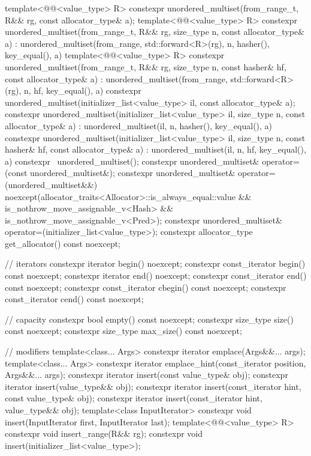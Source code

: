 \begin{codeblock}
{{    template<@@<value_type> R>
      constexpr unordered_multiset(from_range_t, R&& rg, const allocator_type& a);
    template<@@<value_type> R>
      constexpr unordered_multiset(from_range_t, R&& rg, size_type n, const allocator_type& a)
        : unordered_multiset(from_range, std::forward<R>(rg),
                             n, hasher(), key_equal(), a) { }
    template<@@<value_type> R>
      constexpr unordered_multiset(from_range_t, R&& rg, size_type n, const hasher& hf,
                                   const allocator_type& a)
        : unordered_multiset(from_range, std::forward<R>(rg), n, hf, key_equal(), a) { }
    constexpr unordered_multiset(initializer_list<value_type> il, const allocator_type& a);
    constexpr unordered_multiset(initializer_list<value_type> il, size_type n,
                                 const allocator_type& a)
      : unordered_multiset(il, n, hasher(), key_equal(), a) { }
    constexpr unordered_multiset(initializer_list<value_type> il, size_type n, const hasher& hf,
                                 const allocator_type& a)
      : unordered_multiset(il, n, hf, key_equal(), a) { }
    constexpr ~unordered_multiset();
    constexpr unordered_multiset& operator=(const unordered_multiset&);
    constexpr unordered_multiset& operator=(unordered_multiset&&)
      noexcept(allocator_traits<Allocator>::is_always_equal::value &&
               is_nothrow_move_assignable_v<Hash> && is_nothrow_move_assignable_v<Pred>);
    constexpr unordered_multiset& operator=(initializer_list<value_type>);
    constexpr allocator_type get_allocator() const noexcept;

    // iterators
    constexpr iterator       begin() noexcept;
    constexpr const_iterator begin() const noexcept;
    constexpr iterator       end() noexcept;
    constexpr const_iterator end() const noexcept;
    constexpr const_iterator cbegin() const noexcept;
    constexpr const_iterator cend() const noexcept;

    // capacity
    constexpr bool empty() const noexcept;
    constexpr size_type size() const noexcept;
    constexpr size_type max_size() const noexcept;

    // modifiers
    template<class... Args> constexpr iterator emplace(Args&&... args);
    template<class... Args>
      constexpr iterator emplace_hint(const_iterator position, Args&&... args);
    constexpr iterator insert(const value_type& obj);
    constexpr iterator insert(value_type&& obj);
    constexpr iterator insert(const_iterator hint, const value_type& obj);
    constexpr iterator insert(const_iterator hint, value_type&& obj);
    template<class InputIterator> constexpr void insert(InputIterator first, InputIterator last);
    template<@@<value_type> R>
      constexpr void insert_range(R&& rg);
    constexpr void insert(initializer_list<value_type>);

}}
\end{codeblock}
